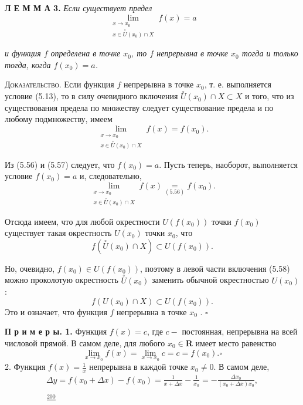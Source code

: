 \documentclass[a4paper, 12pt]{article}
\begin{document}
\thispagestyle{empty}
\textbf{Л Е М М А 3.} \textit {Если существует предел}
\[
\lim_{\substack{x \rightarrow x_0 \\ x \in \stackrel{\circ}{U}\left(x_0\right) \cap X}} f(x)=a
\]

\textit{и функция $f$ определена в точке $x_0$, то $f$ непрерывна в точке $x_0$ тогда и только тогда, когда $f\left(x_0\right)=a$.}

\textsc{Доказательство}. Если функция $f$ непрерывна в точке $x_0$, т. е. выполняется условие (5.13), то в силу очевидного включения $\stackrel{\circ}{U}\left(x_0\right) \cap X \subset X$ и того, что из существования предела по множеству следует существование предела и по любому подмножеству, имеем
\[
\lim_{\substack{x \rightarrow x_0 \\ x \in \stackrel{\circ}{U} \left(x_0\right) \cap X}} f(x)=f\left(x_0\right) .
\]

Из (5.56) и (5.57) следует, что $f\left(x_0\right)=a$.
Пусть теперь, наоборот, выполняется условие $f\left(x_0\right)=a$ и, следовательно,
\[
\lim_{\substack{x \rightarrow{x_0} \\ x \in \stackrel{\circ}{U}\left(x_0\right) \cap{X}}}{f(x)} \underset{(5.56)}{=} f\left(x_0\right) .
\]

Отсюда имеем, что для любой окрестности $U\left(f\left(x_0\right)\right)$ точки $f\left(x_0\right)$ существует такая окрестность $U\left(x_0\right)$ точки $x_0$, что
\[
f\left(\stackrel{\circ}{U}\left(x_0\right) \cap X\right) \subset U\left(f\left(x_0\right)\right) .
\]

Но, очевидно, $f\left(x_0\right) \in U\left(f\left(x_0\right)\right)$, поэтому в левой части включения (5.58) можно проколотую окрестность $\stackrel{\circ}{U}\left(x_0\right)$ заменить обычной окрестностью $U\left(x_0\right)$ :
\[
f\left(U\left(x_0\right) \cap X\right) \subset U\left(f\left(x_0\right)\right) .
\]
Это и означает, что функция $f$ непрерывна в точке $x_0$ . $\square$ 

\textbf{П р и м е р ы. 1.} Функция $f(x)=c$, где $c-$ постоянная, непрерывна на всей числовой прямой.
В самом деле, для любого $x_0 \in \boldsymbol{R}$ имеет место равенство
\[
\lim_{x \rightarrow x_0} f(x)=\lim _{x \rightarrow x_0} c=c=f\left(x_0\right) . \square
\]
2. Функция $f(x)=\frac{1}{x}$ непрерывна в каждой точке $x_0 \neq 0$. В самом деле,
\[
\begin{gathered}
\Delta y=f\left(x_0+\Delta x\right)-f\left(x_0\right)=\frac{1}{x+\Delta x}-\frac{1}{x_0}=-\frac{\Delta x_0}{\left(x_0+\Delta x\right) x_0}, \\
\\
\frac{200}{}
\end{gathered}
\]
\end{document}
